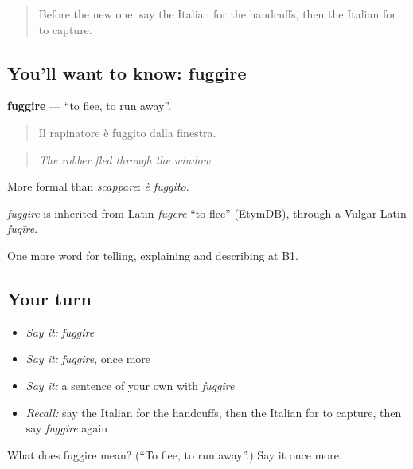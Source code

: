 \label{lesson:IT-C297-fuggire}



\begin{quote}
Before the new one: say the Italian for the handcuffs, then the Italian for to capture.
\end{quote}

\subsection*{You'll want to know: fuggire}
\textbf{fuggire} — \textquotedblleft{}to flee, to run away\textquotedblright{}.

\begin{quote}
Il rapinatore è fuggito dalla finestra.
\end{quote}

\begin{quote}
\emph{The robber fled through the window.}
\end{quote}

More formal than \emph{scappare}: \emph{è fuggito}.

\begin{cousinweb}
\emph{fuggire} is inherited from Latin \emph{fugere} \textquotedblleft{}to flee\textquotedblright{} (EtymDB), through a Vulgar Latin \emph{fugīre}.
\end{cousinweb}

\begin{grammarlens}[title={What you've built}]
One more word for telling, explaining and describing at B1.
\end{grammarlens}

\subsection*{Your turn}
\begin{itemize}
\raggedright
  \item \emph{Say it:} \emph{fuggire}
  \item \emph{Say it:} \emph{fuggire}, once more
  \item \emph{Say it:} a sentence of your own with \emph{fuggire}
  \item \emph{Recall:} say the Italian for the handcuffs, then the Italian for to capture, then say \emph{fuggire} again
\end{itemize}

\begin{tcolorbox}[breakable,colback=teal!4,colframe=teal!35!black,title={Before you move on}]
What does fuggire mean? (\textquotedblleft{}To flee, to run away\textquotedblright{}.) Say it once more.
\end{tcolorbox}
